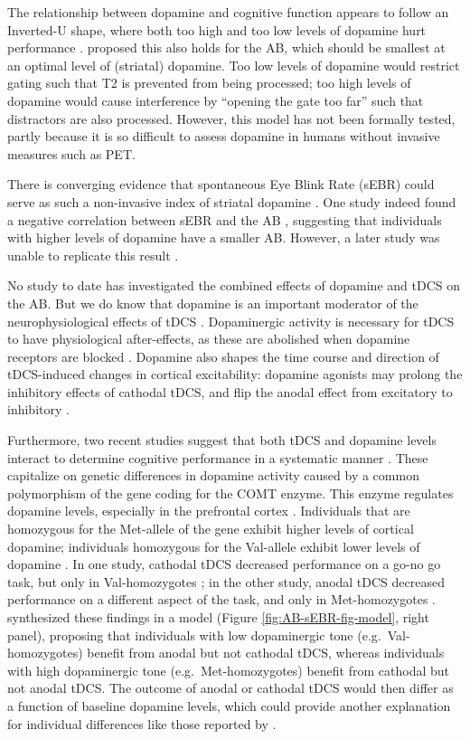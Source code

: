 \documentclass[11pt,]{memoir}
\begin{document}
The relationship between dopamine and cognitive function appears to follow an Inverted-U shape, where both too high and too low levels of dopamine hurt performance \autocite{Cools2011}. \textcite{Slagter2012} proposed this also holds for the AB, which should be smallest at an optimal level of (striatal) dopamine. Too low levels of dopamine would restrict gating such that T2 is prevented from being processed; too high levels of dopamine would cause interference by ``opening the gate too far'' such that distractors are also processed. However, this model has not been formally tested, partly because it is so difficult to assess dopamine in humans without invasive measures such as PET.

There is converging evidence that spontaneous Eye Blink Rate (sEBR) could serve as such a non-invasive index of striatal dopamine \autocite[for a review, see][]{Jongkees2016}. One study indeed found a negative correlation between sEBR and the AB \autocite{Colzato2008}, suggesting that individuals with higher levels of dopamine have a smaller AB. However, a later study was unable to replicate this result \autocite{Slagter2013}.

No study to date has investigated the combined effects of dopamine and tDCS on the AB. But we do know that dopamine is an important moderator of the neurophysiological effects of tDCS \autocite{Stagg2011b}. Dopaminergic activity is necessary for tDCS to have physiological after-effects, as these are abolished when dopamine receptors are blocked \autocite{Nitsche2006}. Dopamine also shapes the time course and direction of tDCS-induced changes in cortical excitability: dopamine agonists may prolong the inhibitory effects of cathodal tDCS, and flip the anodal effect from excitatory to inhibitory \autocite{Kuo2008}.

Furthermore, two recent studies suggest that both tDCS and dopamine levels interact to determine cognitive performance in a systematic manner \autocite{Wiegand2016}. These capitalize on genetic differences in dopamine activity caused by a common polymorphism of the gene coding for the COMT enzyme. This enzyme regulates dopamine levels, especially in the prefrontal cortex \autocite{Kaenmaki2010}. Individuals that are homozygous for the Met-allele of the gene exhibit higher levels of cortical dopamine; individuals homozygous for the Val-allele exhibit lower levels of dopamine \autocite{Schacht2016}. In one study, cathodal tDCS decreased performance on a go-no go task, but only in Val-homozygotes \autocite{Nieratschker2015}; in the other study, anodal tDCS decreased performance on a different aspect of the task, and only in Met-homozygotes \autocite{Plewnia2013}. \textcite{Wiegand2016} synthesized these findings in a model (Figure \ref{fig:AB-sEBR-fig-model}, right panel), proposing that individuals with low dopaminergic tone (e.g.~Val-homozygotes) benefit from anodal but not cathodal tDCS, whereas individuals with high dopaminergic tone (e.g.~Met-homozygotes) benefit from cathodal but not anodal tDCS. The outcome of anodal or cathodal tDCS would then differ as a function of baseline dopamine levels, which could provide another explanation for individual differences like those reported by \textcite{London2015}.
\end{document}
